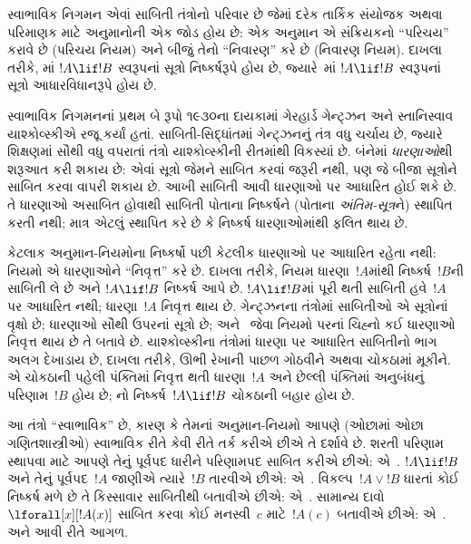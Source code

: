\begingroup
\makeatletter{}\makeatother

\label{guunit:OLP-0664}


\begingroup
\makeatletter{}\makeatother


\label{guunit:OLP-0663}


સ્વાભાવિક નિગમન એવાં સાબિતી
તંત્રોનો પરિવાર છે જેમાં દરેક
તાર્કિક સંયોજક અથવા પરિમાણક
માટે અનુમાનોની એક જોડ હોય છે:
એક અનુમાન એ સંક્રિયકનો
``પરિચય'' કરાવે છે
(પરિચય નિયમ)
અને બીજું તેનો
``નિવારણ'' કરે છે
(નિવારણ નિયમ).
દાખલા તરીકે, \Intro{\lif}માં
$!A \lif !B$ સ્વરૂપનાં
સૂત્રો નિષ્કર્ષરૂપે હોય છે,
જ્યારે~\Elim{\lif}માં
$!A \lif !B$ સ્વરૂપનાં
સૂત્રો
આધારવિધાનરૂપે હોય છે.

સ્વાભાવિક નિગમનનાં પ્રથમ બે
રૂપો ૧૯૩૦ના દાયકામાં ગેરહાર્ડ
ગેન્ટ્ઝન અને સ્તાનિસ્વાવ
યાશ્કોવ્સ્કીએ રજૂ કર્યાં હતાં.
સાબિતી-સિદ્ધાંતમાં ગેન્ટ્ઝનનું
તંત્ર વધુ ચર્ચાય છે, જ્યારે
શિક્ષણમાં સૌથી વધુ વપરાતાં
તંત્રો યાશ્કોવ્સ્કીની રીતમાંથી
વિકસ્યાં છે. બંનેમાં
\emph{ધારણાઓ}થી શરૂઆત
કરી શકાય છે: એવાં
સૂત્રો જેમને
સાબિત કરવાં જરૂરી
નથી, પણ જે બીજા
સૂત્રોને સાબિત
કરવા વાપરી શકાય છે.
આખી સાબિતી આવી
ધારણાઓ પર આધારિત હોઈ
શકે છે. તે ધારણાઓ
અસાબિત હોવાથી સાબિતી
પોતાના નિષ્કર્ષને
(પોતાના \emph{અંતિમ-સૂત્ર}ને)
સ્થાપિત કરતી નથી;
માત્ર એટલું સ્થાપિત
કરે છે કે નિષ્કર્ષ
ધારણાઓમાંથી ફલિત થાય છે.

કેટલાક અનુમાન-નિયમોના
નિષ્કર્ષો પછી કેટલીક ધારણાઓ
પર આધારિત રહેતા નથી:
નિયમો એ ધારણાઓને
``નિવૃત્ત'' કરે છે.
દાખલા તરીકે,
\Intro{\lif} નિયમ
ધારણા~$!A$માંથી
નિષ્કર્ષ~$!B$ની
સાબિતી લે છે અને
$!A \lif !B$ નિષ્કર્ષ આપે છે.
$!A \lif !B$માં પૂરી થતી
સાબિતી હવે~$!A$ પર
આધારિત નથી; ધારણા~$!A$
નિવૃત્ત થાય છે.
ગેન્ટ્ઝનના તંત્રોમાં
સાબિતીઓ એ
સૂત્રોનાં વૃક્ષો છે;
ધારણાઓ સૌથી ઉપરનાં
સૂત્રો છે;
અને~\Intro{\lif} જેવા
નિયમો પરનાં ચિહ્નો કઈ
ધારણાઓ નિવૃત્ત થાય છે
તે બતાવે છે.
યાશ્કોવ્સ્કીના તંત્રોમાં
ધારણા પર આધારિત
સાબિતીનો ભાગ અલગ
દેખાડાય છે, દાખલા તરીકે,
ઊભી રેખાની પાછળ
ગોઠવીને અથવા ચોકઠામાં
મૂકીને. એ ચોકઠાની
પહેલી પંક્તિમાં નિવૃત્ત
થતી ધારણા~$!A$ અને
છેલ્લી પંક્તિમાં
અનુબંધનું પરિણામ~$!B$
હોય છે; \Intro{\lif}નો
નિષ્કર્ષ~$!A \lif !B$
ચોકઠાની બહાર હોય છે.

આ તંત્રો ``સ્વાભાવિક''
છે, કારણ કે તેમનાં
અનુમાન-નિયમો આપણે
(ઓછામાં ઓછા ગણિતશાસ્ત્રીઓ)
સ્વાભાવિક રીતે કેવી રીતે
તર્ક કરીએ છીએ તે દર્શાવે છે.
શરતી પરિણામ સ્થાપવા માટે
આપણે તેનું પૂર્વપદ
ધારીને પરિણામપદ સાબિત
કરીએ છીએ: એ~\Intro{\lif}.
$!A \lif !B$ અને તેનું
પૂર્વપદ~$!A$ જાણીએ
ત્યારે~$!B$ તારવીએ છીએ:
એ~\Elim{\lif}.
વિકલ્પ~$!A \lor !B$
ધારતાં કોઈ નિષ્કર્ષ
મળે છે તે કિસ્સાવાર
સાબિતીથી બતાવીએ છીએ:
એ~\Elim{\lor}.
સામાન્ય દાવો
$\lforall[x][!A(x)]$
સાબિત કરવા કોઈ મનસ્વી~$c$
માટે~$!A(c)$ બતાવીએ છીએ:
એ~\Intro{\lforall}.
અને આવી રીતે આગળ.

